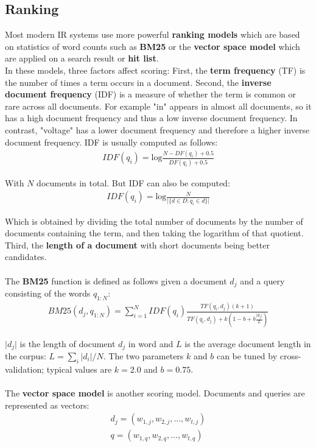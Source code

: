 \documentclass{report}
\begin{document}
\subsection{Ranking}
Most modern IR systems use more powerful {\bf ranking models } which are based on statistics of word counts such as {\bf BM25} or the {\bf vector space model} which are applied on a search result or {\bf hit list}.
\\
In these models, three factors affect scoring: First, the {\bf term frequency} (TF) is the number of times a term occurs in a document.
Second, the {\bf inverse document frequency} (IDF) is a measure of whether the term is common or rare across all documents. For example "in" appears in almost all documents, so it has a high document frequency and thus a low inverse document frequency.
In contrast, "voltage" has a lower document frequency and therefore a higher inverse document frequency.
IDF is usually computed as follows:
\begin{align*}
IDF(q_i) = \mbox{log}\frac{N-DF(q_i) + 0.5}{DF(q_i) + 0.5}
\end{align*}

With $N$ documents in total. But IDF can also be computed:
\begin{align*}
IDF(q_i) = \mbox{log}\frac{N}{\vert \{ d \in D : q_i \in d \} \vert}
\end{align*}

Which is obtained by dividing the total number of documents by the number of documents containing the term, and then taking the logarithm of that quotient.
\\

Third, the {\bf length of a document} with short documents being better candidates. \\ \\
The {\bf BM25} function is defined as follows given a document $d_j$ and a query consisting of the words $q_{1:N}$:
\begin{align*}
BM25(d_j, q_{1:N}) = \sum_{i=1}^{N} IDF(q_i) \frac{TF(q_i, d_j)(k+1)}{TF(q_i,d_j) + k(1-b+b\frac{\vert d_j\vert}{L})}
\end{align*}

$\vert d_j\vert$ is the length of document $d_j$ in word and $L$ is the average document length in the corpus: $L = \sum_i \vert d_i\vert / N$.
The two parameters $k$ and $b$ can be tuned by cross-validation; typical values are $k = 2.0$ and $b = 0.75$.
\\
\\
The {\bf vector space model} is another scoring model. Documents and queries are represented as vectors:
\begin{align*}
d_j = (w_{1,j}, w_{2,j}, ..., w_{t,j}) \\
q = (w_{1,q}, w_{2,q}, ..., w_{t,q})
\end{align*}
\end{document}
